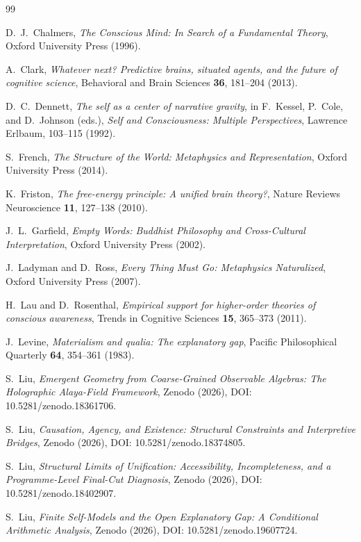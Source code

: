 \documentclass[12pt,a4paper]{article}
\begin{document}
\begin{thebibliography}{99}

D.~J.~Chalmers,
\emph{The Conscious Mind: In Search of a Fundamental Theory},
Oxford University Press (1996).

A.~Clark,
\emph{Whatever next? Predictive brains, situated agents, and the future of cognitive science},
Behavioral and Brain Sciences \textbf{36}, 181--204 (2013).

D.~C.~Dennett,
\emph{The self as a center of narrative gravity},
in F.~Kessel, P.~Cole, and D.~Johnson (eds.),
\emph{Self and Consciousness: Multiple Perspectives},
Lawrence Erlbaum, 103--115 (1992).

S.~French,
\emph{The Structure of the World: Metaphysics and Representation},
Oxford University Press (2014).

K.~Friston,
\emph{The free-energy principle: A unified brain theory?},
Nature Reviews Neuroscience \textbf{11}, 127--138 (2010).

J.~L.~Garfield,
\emph{Empty Words: Buddhist Philosophy and Cross-Cultural Interpretation},
Oxford University Press (2002).

J.~Ladyman and D.~Ross,
\emph{Every Thing Must Go: Metaphysics Naturalized},
Oxford University Press (2007).

H.~Lau and D.~Rosenthal,
\emph{Empirical support for higher-order theories of conscious awareness},
Trends in Cognitive Sciences \textbf{15}, 365--373 (2011).

J.~Levine,
\emph{Materialism and qualia: The explanatory gap},
Pacific Philosophical Quarterly \textbf{64}, 354--361 (1983).

S.~Liu, \emph{Emergent Geometry from Coarse-Grained Observable Algebras: The Holographic Alaya-Field Framework}, Zenodo (2026), DOI: 10.5281/zenodo.18361706.

S.~Liu, \emph{Causation, Agency, and Existence: Structural Constraints and Interpretive Bridges}, Zenodo (2026), DOI: 10.5281/zenodo.18374805.

S.~Liu, \emph{Structural Limits of Unification: Accessibility, Incompleteness, and a Programme-Level Final-Cut Diagnosis}, Zenodo (2026), DOI: 10.5281/zenodo.18402907.

S.~Liu, \emph{Finite Self-Models and the Open Explanatory Gap: A Conditional Arithmetic Analysis}, Zenodo (2026), DOI: 10.5281/zenodo.19607724.


\end{thebibliography}
\end{document}
